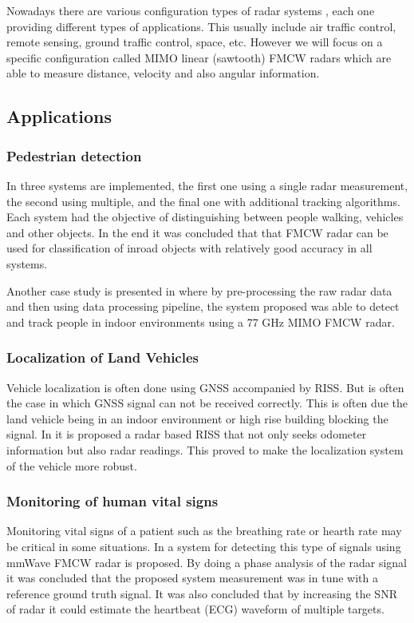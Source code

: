 Nowadays there are various configuration types of radar systems  \cite{typesradar}, each one providing different types of applications. This usually include air traffic control, remote sensing, ground traffic control, space, etc.  However we will focus on a specific configuration called \ac{MIMO} linear (sawtooth)  \ac{FMCW} radars which are  able to measure distance, velocity and also angular information. 

\subsection{Applications}


  \subsubsection{Pedestrian detection}  
 In \cite{heuel2010pedestrian} three systems are implemented, the first one using a single radar measurement, the second using multiple, and the final one with additional tracking algorithms. Each system had the objective of distinguishing between people walking, vehicles and other objects. In the end it was concluded that that \ac{FMCW} \ac{radar} can be used for classification of inroad objects with relatively good accuracy in all systems.
  
   Another case study is presented in \cite{knudde2017indoor} where by pre-processing the raw radar data and then using  data processing pipeline, the system proposed was able to detect and track people in indoor environments using a 77 GHz \ac{MIMO} \ac{FMCW} radar.
   
 \subsubsection{Localization of Land Vehicles}  
  Vehicle localization is often done using \ac{GNSS} accompanied by \ac{RISS}. But is often the case in which \ac{GNSS} signal can not be received correctly. This is often due the land vehicle being in an indoor environment or high rise building blocking the signal. In \cite{abosekeen2018utilizing} it is proposed a radar based \ac{RISS} that not only seeks odometer information but also radar readings. This proved to make the localization system of the vehicle more robust.
  
\subsubsection{Monitoring of human vital signs}  
Monitoring vital signs of a patient such as the breathing rate or hearth rate may be critical in some situations.
In \cite{alizadeh2019remote} a system for detecting this type of signals using \ac{mmWave} \ac{FMCW} \ac{radar} is proposed. By doing a phase analysis of the \ac{radar} signal it was concluded that the proposed system measurement was in tune with a reference ground truth signal. It was also concluded that by increasing the \ac{SNR} of \ac{radar} it could estimate the heartbeat (\ac{ECG}) waveform of multiple targets.

